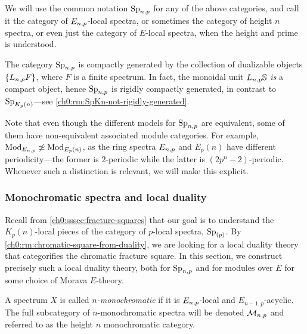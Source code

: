 \begin{notation}
    We will use the common notation $\mathrm{Sp}_{n,p}$ for any of the above categories, and call it the category of $E_{n,p}$-local spectra, or sometimes the category of height $n$ spectra, or even just the category of $E$-local spectra, when the height and prime is understood. 
\end{notation}

\begin{remark}
    The category $\mathrm{Sp}_{n,p}$ is compactly generated by the collection of dualizable objects $\{L_{n,p} F\}$, where $F$ is a finite spectrum. In fact, the monoidal unit $L_{n,p}\mathbb{S}$ \emph{is} a compact object, hence $\mathrm{Sp}_{n,p}$ is rigidly compactly generated, in contrast to $\mathrm{Sp}_{{K_p(n)}}$---see \cref{ch0:rm:SpKn-not-rigidly-generated}.
\end{remark}

\begin{remark}
    Note that even though the different models for $\mathrm{Sp}_{n,p}$ are equivalent, some of them have non-equivalent associated module categories. For example, $\mathrm{Mod}_{E_{n,p}}\not \simeq \mathrm{Mod}_{E_p(n)}$, as the ring spectra $E_{n,p}$ and $E_p(n)$ have different periodicity---the former is $2$-periodic while the latter is $(2p^n-2)$-periodic. Whenever such a distinction is relevant, we will make this explicit. 
\end{remark}





\subsubsection{Monochromatic spectra and local duality}
\label{ch0:sssec:monochromatic-duality}

Recall from \cref{ch0:sssec:fracture-squares} that our goal is to understand the $K_p(n)$-local pieces of the category of $p$-local spectra, $\mathrm{Sp}_{(p)}$. By \cref{ch0:rm:chromatic-square-from-duality}, we are looking for a local duality theory that categorifies the chromatic fracture square. In this section, we construct precisely such a local duality theory, both for $\mathrm{Sp}_{n,p}$ and for modules over $E$ for some choice of Morava $E$-theory. 



\begin{definition}
    \label{ch0:def:monochromatic-spectrum}
    A spectrum $X$ is called \emph{$n$-monochromatic} if it is $E_{n,p}$-local and $E_{n-1,p}$-acyclic. The full subcategory of $n$-monochromatic spectra will be denoted $\mathcal{M}_{n,p}$ and referred to as the height $n$ monochromatic category.
\end{definition}


